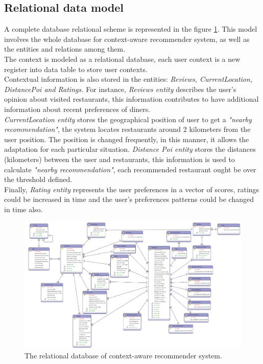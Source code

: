 \subsection{Relational data model} 

A complete database relational scheme is represented in the figure
\ref{fig:datamodel}. This model involves the whole database for
context-aware recommender system, as well as the entities and
relations among them. \\   The context is modeled as a relational database,
each user context is a new register into data table to store user
contexts.\\  Contextual information is also stored in the entities:
\textit{Reviews, CurrentLocation, DistancePoi and Ratings.} For
instance, \textit{Reviews entity} describes the user’s opinion about
visited restaurants, this information contributes to have additional
information about recent preferences of diners.\\   
\textit{CurrentLocation entity} stores the geographical position of
user to get a \textit{"nearby recommendation"}, the system locates
restaurants around 2 kilometers from the user position. The position
is changed frequently, in this manner, it allows the adaptation for
each particular situation. \textit{Distance Poi entity} stores the
distances (kilometers) between the user and restaurants, this
information is used to calculate \textit{"nearby recommendation"}, 
each recommended restaurant ought be over the threshold defined.\\   
Finally, \textit{Rating entity} represents the user preferences 
in a vector of scores, ratings could be increased in time and 
the user's preferences patterns could be changed in time also.
\begin{landscape} 
\begin{figure}[!h] 
\centering
\includegraphics[width=1.3\textwidth]{img/recomet.png}
\caption{The relational database of context-aware recommender system.}
\label{fig:datamodel}    
\end{figure}
\end{landscape}

